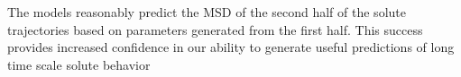 \documentclass{article}
\begin{document}
  The models reasonably predict the MSD of the second half of the solute 
  trajectories based on parameters generated from the first half. This success
  provides increased confidence in our ability to generate useful predictions
  of long time scale solute behavior
 
\end{document}
